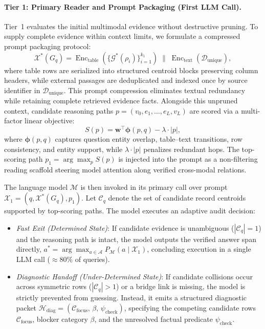 \documentclass[runningheads]{llncs}
\begin{document}
\paragraph{Tier 1: Primary Reader and Prompt Packaging (First LLM Call).}
Tier~1 evaluates the initial multimodal evidence without destructive pruning. To supply complete evidence within context limits, we formulate a compressed prompt packaging protocol:
\begin{equation}
\label{eq:compression}
\mathcal{X}^*(G_q) = \operatorname{Enc}_{\text{table}}\left(\{\mathcal{G}^*(\rho_i)\}_{i=1}^{k_1}\right) \;\parallel\; \operatorname{Enc}_{\text{text}}(\mathcal{D}_{\text{unique}}),
\end{equation}
where table rows are serialized into structured centroid blocks preserving column headers, while external passages are deduplicated and indexed once by source identifier in $\mathcal{D}_{\text{unique}}$. This prompt compression eliminates textual redundancy while retaining complete retrieved evidence facts. Alongside this unpruned context, candidate reasoning paths $p = (v_0, e_1, \dots, e_L, v_L)$ are scored via a multi-factor linear objective:
\begin{equation}
\label{eq:path-score}
S(p) = \mathbf{w}^\top \boldsymbol{\phi}(p, q) - \lambda \cdot |p|,
\end{equation}
where $\boldsymbol{\phi}(p, q)$ captures question entity overlap, table--text transitions, row consistency, and entity support, while $\lambda \cdot |p|$ penalizes redundant hops. The top-scoring path $p_1 = \arg\max_{p} S(p)$ is injected into the prompt as a non-filtering reading scaffold steering model attention along verified cross-modal relations.

The language model $\mathcal{M}$ is then invoked in its primary call over prompt $\mathcal{X}_1 = (q, \mathcal{X}^*(G_q), p_1)$. Let $\mathcal{C}_q$ denote the set of candidate record centroids supported by top-scoring paths. The model executes an adaptive audit decision:
\begin{itemize}[leftmargin=1.5em]
    \item \emph{Fast Exit (Determined State)}: If candidate evidence is unambiguous ($|\mathcal{C}_q| = 1$) and the reasoning path is intact, the model outputs the verified answer span directly, $a^* = \arg\max_{a \in \mathcal{A}} P_{\mathcal{M}}(a \mid \mathcal{X}_1)$, concluding execution in a single LLM call ($\approx 80\%$ of queries).
    \item \emph{Diagnostic Handoff (Under-Determined State)}: If candidate collisions occur across symmetric rows ($|\mathcal{C}_q| > 1$) or a bridge link is missing, the model is strictly prevented from guessing. Instead, it emits a structured diagnostic packet $\mathcal{H}_{\text{diag}} = (\mathcal{C}_{\text{focus}}, \, \beta, \, \psi_{\text{check}})$, specifying the competing candidate rows $\mathcal{C}_{\text{focus}}$, blocker category $\beta$, and the unresolved factual predicate $\psi_{\text{check}}$.
\end{itemize}
\end{document}
